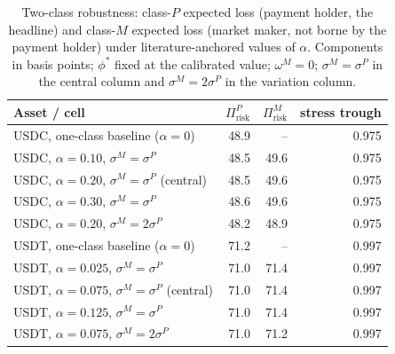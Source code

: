 \begin{table}[H]
\centering
\caption{Two-class robustness: class-$P$ expected loss (payment holder, the headline) and class-$M$ expected loss (market maker, not borne by the payment holder) under literature-anchored values of $\alpha$. Components in basis points; $\phi^*$ fixed at the calibrated value; $\omega^M = 0$; $\sigma^M = \sigma^P$ in the central column and $\sigma^M = 2 \sigma^P$ in the variation column.}\label{tab:two_class_robustness}
\begin{tabular}{lrrr}
\toprule
Asset / cell                                          & $\Pi_{\text{risk}}^P$ & $\Pi_{\text{risk}}^M$ & stress trough \\
\midrule
USDC, one-class baseline ($\alpha = 0$)               & 48.9 & --   & 0.975 \\
USDC, $\alpha = 0.10$, $\sigma^M = \sigma^P$          & 48.5 & 49.6 & 0.975 \\
USDC, $\alpha = 0.20$, $\sigma^M = \sigma^P$ (central) & 48.5 & 49.6 & 0.975 \\
USDC, $\alpha = 0.30$, $\sigma^M = \sigma^P$          & 48.6 & 49.6 & 0.975 \\
USDC, $\alpha = 0.20$, $\sigma^M = 2 \sigma^P$        & 48.2 & 48.9 & 0.975 \\
\midrule
USDT, one-class baseline ($\alpha = 0$)               & 71.2 & --   & 0.997 \\
USDT, $\alpha = 0.025$, $\sigma^M = \sigma^P$         & 71.0 & 71.4 & 0.997 \\
USDT, $\alpha = 0.075$, $\sigma^M = \sigma^P$ (central) & 71.0 & 71.4 & 0.997 \\
USDT, $\alpha = 0.125$, $\sigma^M = \sigma^P$         & 71.0 & 71.4 & 0.997 \\
USDT, $\alpha = 0.075$, $\sigma^M = 2 \sigma^P$       & 71.0 & 71.2 & 0.997 \\
\bottomrule
\end{tabular}
\end{table}

